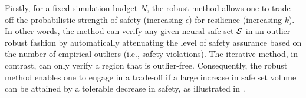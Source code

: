Firstly, for a fixed simulation budget $N$, the robust method allows one to trade off the probabilistic strength of safety (increasing $\epsilon$) for resilience (increasing $k$).
In other words, the method can verify any given neural safe set $\mathcal{S}$ in an outlier-robust fashion by automatically attenuating the level of safety assurance based on the number of empirical outliers (i.e., safety violations).
The iterative method, in contrast, can only verify a region that is outlier-free.
Consequently, the robust method enables one to engage in a trade-off if a large increase in safe set volume can be attained by a tolerable decrease in safety, as illustrated in .
